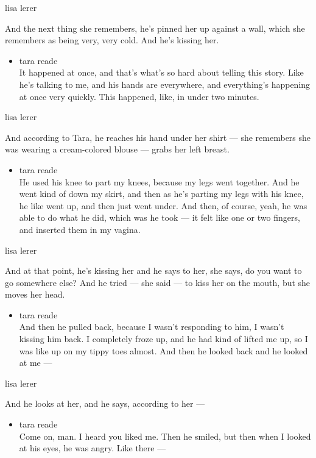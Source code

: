 lisa lerer

And the next thing she remembers, he's pinned her up against a wall,
which she remembers as being very, very cold. And he's kissing her.

\begin{itemize}
\tightlist
\item
  tara reade\\
  It happened at once, and that's what's so hard about telling this
  story. Like he's talking to me, and his hands are everywhere, and
  everything's happening at once very quickly. This happened, like, in
  under two minutes.
\end{itemize}

lisa lerer

And according to Tara, he reaches his hand under her shirt --- she
remembers she was wearing a cream-colored blouse --- grabs her left
breast.

\begin{itemize}
\tightlist
\item
  tara reade\\
  He used his knee to part my knees, because my legs went together. And
  he went kind of down my skirt, and then as he's parting my legs with
  his knee, he like went up, and then just went under. And then, of
  course, yeah, he was able to do what he did, which was he took --- it
  felt like one or two fingers, and inserted them in my vagina.
\end{itemize}

lisa lerer

And at that point, he's kissing her and he says to her, she says, do you
want to go somewhere else? And he tried --- she said --- to kiss her on
the mouth, but she moves her head.

\begin{itemize}
\tightlist
\item
  tara reade\\
  And then he pulled back, because I wasn't responding to him, I wasn't
  kissing him back. I completely froze up, and he had kind of lifted me
  up, so I was like up on my tippy toes almost. And then he looked back
  and he looked at me ---
\end{itemize}

lisa lerer

And he looks at her, and he says, according to her ---

\begin{itemize}
\tightlist
\item
  tara reade\\
  Come on, man. I heard you liked me. Then he smiled, but then when I
  looked at his eyes, he was angry. Like there ---
\end{itemize}

